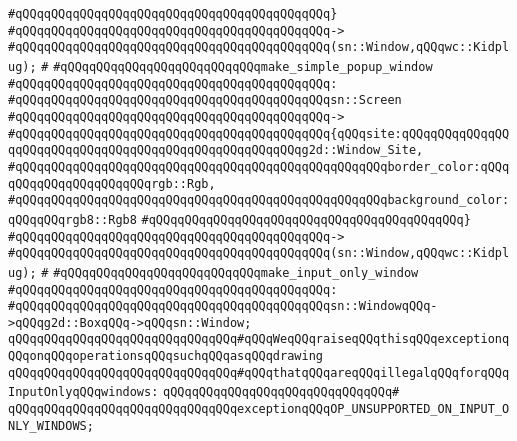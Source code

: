 \verb|#qQQqqQQqqQQqqQQqqQQqqQQqqQQqqQQqqQQqqQQqqQQq}|\newline
\verb|#qQQqqQQqqQQqqQQqqQQqqQQqqQQqqQQqqQQqqQQqqQQq->|\newline
\verb|#qQQqqQQqqQQqqQQqqQQqqQQqqQQqqQQqqQQqqQQqqQQq(sn::Window,qQQqwc::Kidplug);|\newline
\verb|#|\newline
\verb|#qQQqqQQqqQQqqQQqqQQqqQQqqQQqmake_simple_popup_window|\newline
\verb|#qQQqqQQqqQQqqQQqqQQqqQQqqQQqqQQqqQQqqQQqqQQq:|\newline
\verb|#qQQqqQQqqQQqqQQqqQQqqQQqqQQqqQQqqQQqqQQqqQQqsn::Screen|\newline
\verb|#qQQqqQQqqQQqqQQqqQQqqQQqqQQqqQQqqQQqqQQqqQQq->|\newline
\verb|#qQQqqQQqqQQqqQQqqQQqqQQqqQQqqQQqqQQqqQQqqQQq{qQQqsite:qQQqqQQqqQQqqQQqqQQqqQQqqQQqqQQqqQQqqQQqqQQqqQQqqQQqqQQqg2d::Window_Site,|\newline
\verb|#qQQqqQQqqQQqqQQqqQQqqQQqqQQqqQQqqQQqqQQqqQQqqQQqqQQqborder_color:qQQqqQQqqQQqqQQqqQQqqQQqrgb::Rgb,|\newline
\verb|#qQQqqQQqqQQqqQQqqQQqqQQqqQQqqQQqqQQqqQQqqQQqqQQqqQQqbackground_color:qQQqqQQqrgb8::Rgb8|\newline
\verb|#qQQqqQQqqQQqqQQqqQQqqQQqqQQqqQQqqQQqqQQqqQQq}|\newline
\verb|#qQQqqQQqqQQqqQQqqQQqqQQqqQQqqQQqqQQqqQQqqQQq->|\newline
\verb|#qQQqqQQqqQQqqQQqqQQqqQQqqQQqqQQqqQQqqQQqqQQq(sn::Window,qQQqwc::Kidplug);|\newline
\verb|#|\newline
\verb|#qQQqqQQqqQQqqQQqqQQqqQQqqQQqmake_input_only_window|\newline
\verb|#qQQqqQQqqQQqqQQqqQQqqQQqqQQqqQQqqQQqqQQqqQQq:|\newline
\verb|#qQQqqQQqqQQqqQQqqQQqqQQqqQQqqQQqqQQqqQQqqQQqsn::WindowqQQq->qQQqg2d::BoxqQQq->qQQqsn::Window;|\newline
\newline
\verb|qQQqqQQqqQQqqQQqqQQqqQQqqQQqqQQq#qQQqWeqQQqraiseqQQqthisqQQqexceptionqQQqonqQQqoperationsqQQqsuchqQQqasqQQqdrawing|\newline
\verb|qQQqqQQqqQQqqQQqqQQqqQQqqQQqqQQq#qQQqthatqQQqareqQQqillegalqQQqforqQQqInputOnlyqQQqwindows:|\newline
\verb|qQQqqQQqqQQqqQQqqQQqqQQqqQQqqQQq#|\newline
\verb|qQQqqQQqqQQqqQQqqQQqqQQqqQQqqQQqexceptionqQQqOP_UNSUPPORTED_ON_INPUT_ONLY_WINDOWS;|\newline
